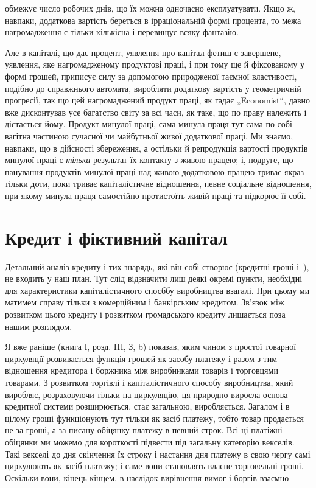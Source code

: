 \parcont{}  %
обмежує число робочих днів, що їх можна одночасно експлуатувати.
Якщо ж, навпаки, додаткова вартість береться в ірраціональній
формі процента, то межа нагромадження є тільки кількісна
і перевищує всяку фантазію.

Але в капіталі, що дає процент, уявлення про капітал-фетиш
є завершене, уявлення, яке нагромадженому продуктові праці,
і при тому ще й фіксованому у формі грошей, приписує силу за
допомогою природженої таємної властивості, подібно до справжнього
автомата, виробляти додаткову вартість у геометричній
прогресії, так що цей нагромаджений продукт праці, як гадає
„Economist“, давно вже дисконтував усе багатство світу за всі
часи, як таке, що по праву належить і дістається йому. Продукт
минулої праці, сама минула праця тут сама по собі вагітна частиною
сучасної чи майбутньої живої додаткової праці. Ми знаємо,
навпаки, що в дійсності збереження, а остільки й репродукція
вартості продуктів минулої праці є \emph{тільки} результат їх
контакту з живою працею; і, подруге, що панування продуктів
минулої праці над живою додатковою працею триває якраз тільки
доти, поки триває капіталістичне відношення, певне соціальне
відношення, при якому минула праця самостійно протистоїть
живій праці та підкорює її собі.

\section{Кредит і фіктивний капітал}

Детальний аналіз кредиту і тих знарядь, які він собі створює
(кредитні гроші і~), не входить у наш план. Тут слід відзначити
лиш деякі окремі пункти, необхідні для характеристики
капіталістичного спосббу виробництва взагалі. При цьому ми
матимем справу тільки з комерційним і банкірським кредитом.
Зв’язок між розвитком цього кредиту і розвитком громадського
кредиту лишається поза нашим розглядом.

Я вже раніше (книга І, розд. III, З, b) показав, яким чином
з простої товарної циркуляції розвивається функція грошей як
засобу платежу і разом з тим відношення кредитора і боржника
між виробниками товарів і торговцями товарами. З розвитком
торгівлі і капіталістичного способу виробництва, який
виробляє, розраховуючи тільки на циркуляцію, ця природно виросла
основа кредитної системи розширюється, стає загальною,
виробляється. Загалом і в цілому гроші функціонують тут тільки
як засіб платежу, тобто товар продається не за гроші, а за
писану обіцянку платежу в певний строк. Всі ці платіжні обіцянки
ми можемо для короткості підвести під загальну категорію
векселів. Такі векселі до дня скінчення їх строку і настання
дня платежу в свою чергу самі циркулюють як засіб платежу;
і саме вони становлять власне торговельні гроші. Оскільки вони,
кінець-кінцем, в наслідок вирівнення вимог і боргів взаємно
\parbreak{}  %
